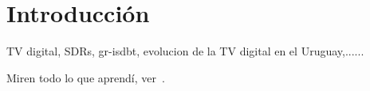 \chapter{Introducción}

TV digital, SDRs, gr-isdbt, evolucion de la TV digital en el Uruguay,......

Miren todo lo que aprendí, ver~\cite{Autor}.

